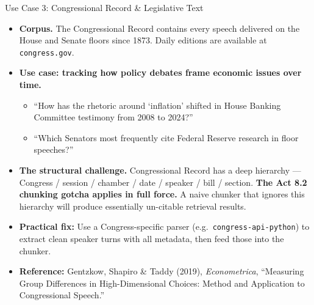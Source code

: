 \begin{frame}{Use Case 3: Congressional Record \& Legislative Text}
\begin{itemize}
\item \textbf{Corpus.} The Congressional Record contains every speech delivered on the House and Senate floors since 1873. Daily editions are available at \texttt{congress.gov}.

\medskip
\item \textbf{Use case: tracking how policy debates frame economic issues over time.}
\begin{itemize}
    \item ``How has the rhetoric around `inflation' shifted in House Banking Committee testimony from 2008 to 2024?''
    \item ``Which Senators most frequently cite Federal Reserve research in floor speeches?''
\end{itemize}

\medskip
\item \textbf{The structural challenge.} Congressional Record has a deep hierarchy --- Congress / session / chamber / date / speaker / bill / section. \textbf{The Act 8.2 chunking gotcha applies in full force.} A naive chunker that ignores this hierarchy will produce essentially un-citable retrieval results.

\medskip
\item \textbf{Practical fix:} Use a Congress-specific parser (e.g.\ \texttt{congress-api-python}) to extract clean speaker turns with all metadata, then feed those into the chunker.

\medskip
\item \textbf{Reference:} Gentzkow, Shapiro \& Taddy (2019), \emph{Econometrica}, ``Measuring Group Differences in High-Dimensional Choices: Method and Application to Congressional Speech.''
\end{itemize}
\end{frame}

